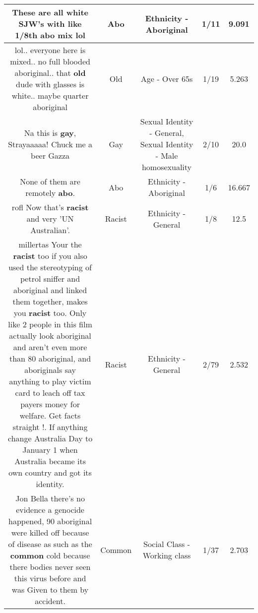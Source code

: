 \documentclass[11pt]{article}
\newlength\mylength
\begin{document}
\begin{center}
\begin{longtable}{|C{.65\mylength}|C{.30\mylength}|C{.12\mylength}|C{.12\mylength}|C{.12\mylength}|}
  \small These are all white SJW's with like 1/8th \textbf{abo} mix lol\normalsize   & Abo & Ethnicity - Aboriginal & 1/11 & 9.091 \\  \hline
  \small lol.. everyone here is mixed.. no full blooded aboriginal.. that \textbf{old} dude with glasses is white.. maybe quarter aboriginal\normalsize   & Old & Age - Over 65s & 1/19 & 5.263 \\  \hline
  \small Na this is \textbf{g\textbf{ay}}, Strayaaaaa! Chuck me a beer Gazza\normalsize   & Gay & Sexual Identity - General, Sexual Identity - Male homosexuality & 2/10 & 20.0 \\  \hline
  \small None of them are remotely \textbf{abo}.\normalsize   & Abo & Ethnicity - Aboriginal & 1/6 & 16.667 \\  \hline
  \small rofl Now that's \textbf{racist} and very 'UN Australian'.\normalsize   & Racist & Ethnicity - General & 1/8 & 12.5 \\  \hline
  \small millertas Your the \textbf{racist} too if you also used the stereotyping of petrol sniffer and aboriginal and linked them together, makes you \textbf{racist} too. Only like 2 people in this film actually look aboriginal and aren't even more than 80 aboriginal, and aboriginals say anything to play victim card to leach off tax payers money for welfare. Get facts straight !. If anything change Australia Day to January 1 when Australia became its own country and got its identity.\normalsize   & Racist & Ethnicity - General & 2/79 & 2.532 \\  \hline
  \small Jon Bella there's no evidence a genocide happened, 90 aboriginal were killed off because of disease as such as the \textbf{common} cold because there bodies never seen this virus before and was Given to them by accident.\normalsize   & Common & Social Class - Working class & 1/37 & 2.703 \\  \hline

\end{longtable}
\end{center}
\end{document}
